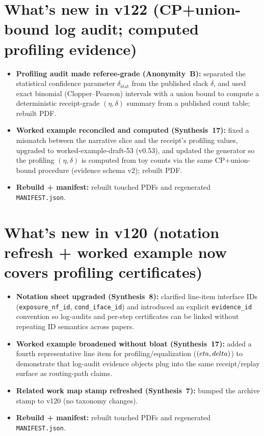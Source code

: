 \documentclass[11pt]{article}
\begin{document}
\section{What's new in v122 (CP+union-bound log audit; computed profiling evidence)}
\begin{itemize}[leftmargin=*]
\item \textbf{Profiling audit made referee-grade (Anonymity~B):} separated the statistical confidence parameter $\delta_{\mathrm{stat}}$ from the published slack $\delta$, and used exact binomial (Clopper--Pearson) intervals with a union bound to compute a deterministic receipt-grade $(\eta,\delta)$ summary from a published count table; rebuilt PDF.
\item \textbf{Worked example reconciled and computed (Synthesis~17):} fixed a mismatch between the narrative slice and the receipt's profiling values, upgraded to worked-example-draft-53 (v0.53), and updated the generator so the profiling $(\eta,\delta)$ is computed from toy counts via the same CP+union-bound procedure (evidence schema v2); rebuilt PDF.
\item \textbf{Rebuild + manifest:} rebuilt touched PDFs and regenerated \texttt{MANIFEST.json}.
\end{itemize}




\section{What's new in v120 (notation refresh + worked example now covers profiling certificates)}
\begin{itemize}[leftmargin=*]
\item \textbf{Notation sheet upgraded (Synthesis~8):} clarified line-item interface IDs (\texttt{exposure\_nf\_id}, \texttt{cond\_iface\_id}) and introduced an explicit \texttt{evidence\_id} convention so log-audits and per-step certificates can be linked without repeating ID semantics across papers.
\item \textbf{Worked example broadened without bloat (Synthesis~17):} added a fourth representative line item for profiling/equalization ($(\\eta,\\delta)$) to demonstrate that log-audit evidence objects plug into the same receipt/replay surface as routing-path claims.
\item \textbf{Related work map stamp refreshed (Synthesis~7):} bumped the archive stamp to v120 (no taxonomy changes).
\item \textbf{Rebuild + manifest:} rebuilt touched PDFs and regenerated \texttt{MANIFEST.json}.
\end{itemize}
\end{document}

